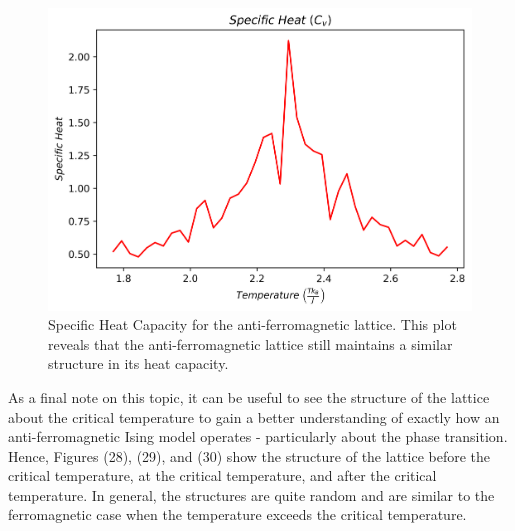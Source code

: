 \documentclass[twocolumn]{article}
\begin{document}
\begin{figure}[H]
\caption{Specific Heat Capacity for the anti-ferromagnetic lattice. This plot reveals that the anti-ferromagnetic lattice still maintains a similar structure in its heat capacity.}
\centering
\includegraphics[scale=.45]{AntiSH128}
\end{figure}
As a final note on this topic, it can be useful to see the structure of the lattice about the critical temperature to gain a better understanding of exactly how an anti-ferromagnetic Ising model operates - particularly about the phase transition. Hence, Figures (28), (29), and (30) show the structure of the lattice before the critical temperature, at the critical temperature, and after the critical temperature. In general, the structures are quite random and are similar to the ferromagnetic case when the temperature exceeds the critical temperature.
\end{document}
